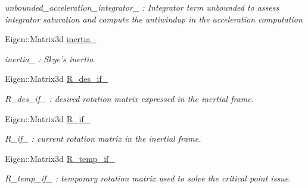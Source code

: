 \begin{DoxyCompactItemize}
\begin{DoxyCompactList}\small\item\em unbounded\-\_\-acceleration\-\_\-integrator\-\_\- \-: Integrator term unbounded to assess integrator saturation and compute the antiwindup in the acceleration computation \end{DoxyCompactList}\item 
\hypertarget{class_skye_geometric_controller_ad20795ca57fd77c2c39f4c95de71c80b}{Eigen\-::\-Matrix3d \hyperlink{class_skye_geometric_controller_ad20795ca57fd77c2c39f4c95de71c80b}{inertia\-\_\-}}\label{class_skye_geometric_controller_ad20795ca57fd77c2c39f4c95de71c80b}

\begin{DoxyCompactList}\small\item\em inertia\-\_\- \-: Skye's inertia \end{DoxyCompactList}\item 
\hypertarget{class_skye_geometric_controller_a83448970f18a48b681ba7ca77c504b7f}{Eigen\-::\-Matrix3d \hyperlink{class_skye_geometric_controller_a83448970f18a48b681ba7ca77c504b7f}{R\-\_\-des\-\_\-if\-\_\-}}\label{class_skye_geometric_controller_a83448970f18a48b681ba7ca77c504b7f}

\begin{DoxyCompactList}\small\item\em R\-\_\-des\-\_\-if\-\_\- \-: desired rotation matrix expressed in the inertial frame. \end{DoxyCompactList}\item 
\hypertarget{class_skye_geometric_controller_a686c4c6992f018d39c96532be5c6b828}{Eigen\-::\-Matrix3d \hyperlink{class_skye_geometric_controller_a686c4c6992f018d39c96532be5c6b828}{R\-\_\-if\-\_\-}}\label{class_skye_geometric_controller_a686c4c6992f018d39c96532be5c6b828}

\begin{DoxyCompactList}\small\item\em R\-\_\-if\-\_\- \-: current rotation matrix in the inertial frame. \end{DoxyCompactList}\item 
\hypertarget{class_skye_geometric_controller_aa884a5b96a3af0ddea0dc8b3f37f11eb}{Eigen\-::\-Matrix3d \hyperlink{class_skye_geometric_controller_aa884a5b96a3af0ddea0dc8b3f37f11eb}{R\-\_\-temp\-\_\-if\-\_\-}}\label{class_skye_geometric_controller_aa884a5b96a3af0ddea0dc8b3f37f11eb}

\begin{DoxyCompactList}\small\item\em R\-\_\-temp\-\_\-if\-\_\- \-: temporary rotation matrix used to solve the critical point issue. \end{DoxyCompactList}\end{DoxyCompactItemize}


